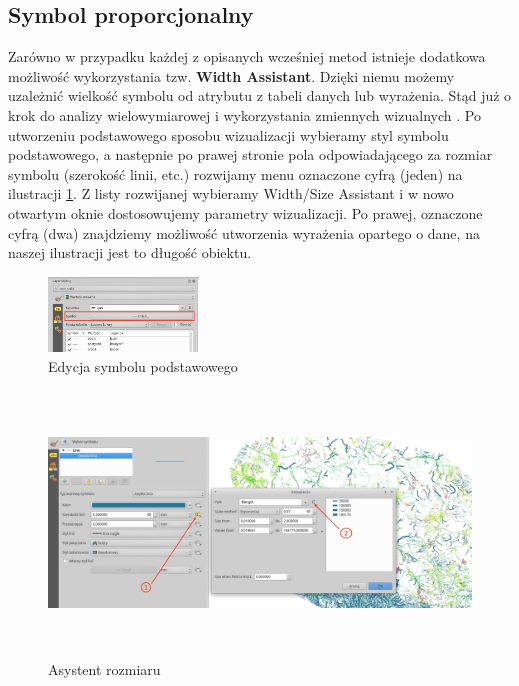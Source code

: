 \documentclass[12pt,a4paper]{book}
\begin{document}
\subsection{Symbol proporcjonalny}
Zarówno w przypadku każdej z opisanych wcześniej metod istnieje dodatkowa możliwość wykorzystania tzw. \textbf{Width Assistant}. Dzięki niemu możemy uzależnić wielkość symbolu od atrybutu z tabeli danych lub wyrażenia.  Stąd już o krok do analizy wielowymiarowej i wykorzystania zmiennych wizualnych \cite{kraak2011cartography}.
Po utworzeniu podstawowego sposobu wizualizacji wybieramy styl symbolu podstawowego, a następnie po prawej stronie pola odpowiadającego za rozmiar symbolu (szerokość linii, etc.) rozwijamy menu oznaczone cyfrą (jeden) na ilustracji \ref{fig:width-ass}. Z listy rozwijanej wybieramy Width/Size Assistant i w nowo otwartym oknie dostosowujemy parametry wizualizacji. Po prawej, oznaczone cyfrą (dwa) znajdziemy możliwość utworzenia wyrażenia opartego o dane, na naszej ilustracji jest to długość obiektu.  
\begin{figure}[!ht]
	\centering
	\includegraphics[height=2cm]{007-edycja-symbolu-podstawowego}
	\caption{Edycja symbolu podstawowego}
\end{figure}
\begin{figure}[!ht]
	\centering
	\includegraphics[height=7cm]{007-width-assistant}
	\caption{Asystent rozmiaru}\label{fig:width-ass}
\end{figure}
\end{document}
